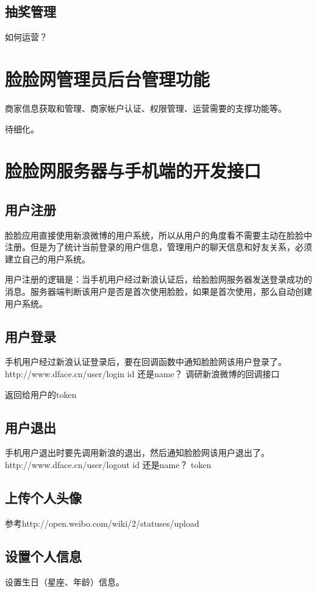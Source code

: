 \documentclass[cs4size]{ctexartutf8}
\begin{document}
\subsection{抽奖管理}
如何运营？


\section{脸脸网管理员后台管理功能}
商家信息获取和管理、商家帐户认证、权限管理、运营需要的支撑功能等。

待细化。



\section{脸脸网服务器与手机端的开发接口}
\subsection{用户注册}
脸脸应用直接使用新浪微博的用户系统，所以从用户的角度看不需要主动在脸脸中注册。但是为了统计当前登录的用户信息，管理用户的聊天信息和好友关系，必须建立自己的用户系统。

用户注册的逻辑是：当手机用户经过新浪认证后，给脸脸网服务器发送登录成功的消息。服务器端判断该用户是否是首次使用脸脸，如果是首次使用，那么自动创建用户系统。

\subsection{用户登录}
手机用户经过新浪认证登录后，要在回调函数中通知脸脸网该用户登录了。
http://www.dface.cn/user/login
id 还是name？ 调研新浪微博的回调接口

返回给用户的token


\subsection{用户退出}
手机用户退出时要先调用新浪的退出，然后通知脸脸网该用户退出了。
http://www.dface.cn/user/logout
id 还是name？
token

\subsection{上传个人头像}
参考http://open.weibo.com/wiki/2/statuses/upload

\subsection{设置个人信息}
设置生日（星座、年龄）信息。
\end{document}
